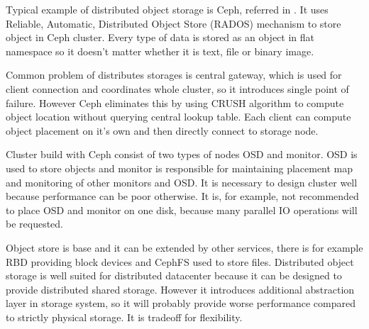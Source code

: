 Typical example of distributed object storage is Ceph, referred in \cite{ceph}. It uses Reliable, Automatic, Distributed Object Store (\Ac{RADOS}) mechanism to store object in Ceph cluster. Every type of data is stored as an object in flat namespace so it doesn't matter whether it is text, file or binary image. 

Common problem of distributes storages is central gateway, which is used for client connection and coordinates whole cluster, so it introduces single point of failure. However Ceph eliminates this by using \Ac{CRUSH} algorithm to compute object location without querying central lookup table. Each client can compute object placement on it's own and then directly connect to storage node.

Cluster build with Ceph consist of two types of nodes \Ac{OSD} and monitor. \Ac{OSD} is used to store objects and monitor is responsible for maintaining placement map and monitoring of other monitors and \Ac{OSD}. It is necessary to design cluster well because performance can be poor otherwise. It is, for example, not recommended to place \Ac{OSD} and monitor on one disk, because many parallel \Ac{IO} operations will be requested.

Object store is base and it can be extended by other services, there is for example \Ac{RBD} providing block devices and CephFS used to store files. Distributed object storage is well suited for distributed datacenter because it can be designed to provide distributed shared storage. However it introduces additional abstraction layer in storage system, so it will probably provide worse performance compared to strictly physical storage. It is tradeoff for flexibility.




